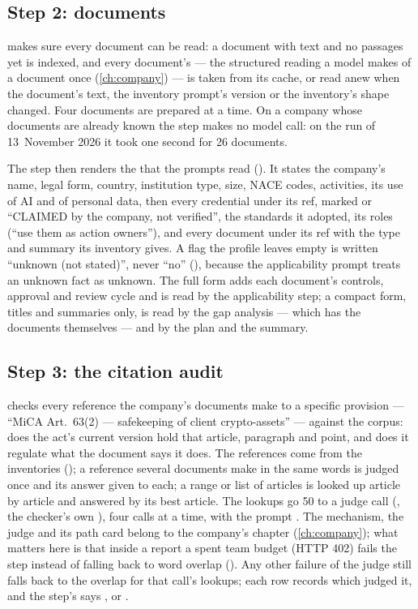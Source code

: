 \subsection{Step 2: documents}

 makes sure every document can be read: a document with text and no
passages yet is indexed, and every document's  --- the structured reading a
model makes of a document once (\cref{ch:company}) --- is taken from its cache, or read anew
when the document's text, the inventory prompt's version or the inventory's shape changed.
Four documents are prepared at a time. On a company whose documents are already known the step
makes no model call: on the run of 13~November 2026 it took one second for 26 documents.

The step then renders the  that the prompts read ().
It states the company's name, legal form, country, institution type, size, NACE codes,
activities, its use of AI and of personal data, then every credential under its ref, marked
 or \enquote{CLAIMED by the company, not verified}, the standards it adopted, its
roles (\enquote{use them as action owners}), and every document under its ref with the type and
summary its inventory gives. A flag the profile leaves empty is written \enquote{unknown (not
stated)}, never \enquote{no} (), because the applicability prompt treats an unknown
fact as unknown. The full form adds each document's controls, approval and review cycle and is
read by the applicability step; a compact form, titles and summaries only, is read by the gap
analysis --- which has the documents themselves --- and by the plan and the summary.

\subsection{Step 3: the citation audit}

 checks every reference the company's documents make to a specific
provision --- \enquote{MiCA Art.~63(2) --- safekeeping of client crypto-assets} --- against the
corpus: does the act's current version hold that article, paragraph and point, and does it
regulate what the document says it does. The references come from the inventories
(); a reference several documents make in the same words is judged once
and its answer given to each; a range or list of articles is looked up article by article and
answered by its best article. The lookups go 50 to a judge call (,
the checker's own ), four calls at a time, with the prompt
. The mechanism, the judge and its path card belong to the
company's chapter (\cref{ch:company}); what matters here is that inside a report a spent team
budget (HTTP 402) fails the step instead of falling back to word overlap
(). Any other failure of the judge still falls back to the overlap
for that call's lookups; each row records which judged it, and the step's  says
,  or .

